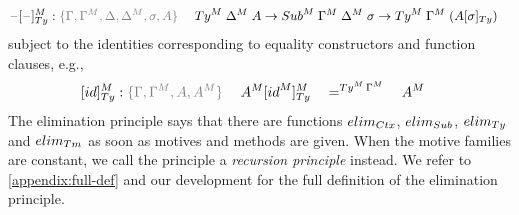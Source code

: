 \documentclass[a4paper,UKenglish,numberwithinsect,cleveref,thm-restate]{lipics-v2021}
\begin{document}
\begin{alignat*}{3}
  \blank[\blank]_{\Ty}^M & : \implicit{\Gamma, \Gamma^M,\Delta, \Delta^M, \sigma, A} \; && \Ty^M\;\Delta^M\;A \to \Sub^M\;\Gamma^M\;\Delta^M\;\sigma \to \Ty^M\;\Gamma^M\;(\subTy{A}{\sigma}) %
\end{alignat*}
subject to the identities corresponding to equality constructors and function clauses, e.g.,
\begin{alignat*}{5}
  [\idS]_{\Ty}^M & : \implicit{\Gamma, \Gamma^M, A, A^M}\; && A^M [ \idS^M ]^M_{\Ty} && =^{\Ty^M\,\Gamma^M}\;&& A^M %
\end{alignat*}
%
The elimination principle says that there are functions $\elim_{\Ctx}$, $\elim_{\Sub}$, $\elim_{\Ty}$ and $\elim_{\Tm}$ as soon as motives and methods are given.
When the motive families are constant, we call the principle a \emph{recursion principle} instead.
We refer to \cref{appendix:full-def} and our \Agda development for the full definition of the elimination principle.
%
%
\end{document}
